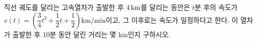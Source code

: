 직선 궤도를 달리는 고속열차가 출발한 후 $4\mkern3mu \mathrm{km}$를 달리는 동안은 $t$분 후의 속도가 $v(t)=\left(\dfrac{3}{4}t^2+\dfrac{1}{2}t+\dfrac{1}{2}\right)\mathrm{km/min}$이고, 그 이후로는 속도가 일정하다고 한다. 이 열차가 출발한 후 $10$분 동안 달린 거리는 몇 $\mathrm{km}$인지 구하시오.
